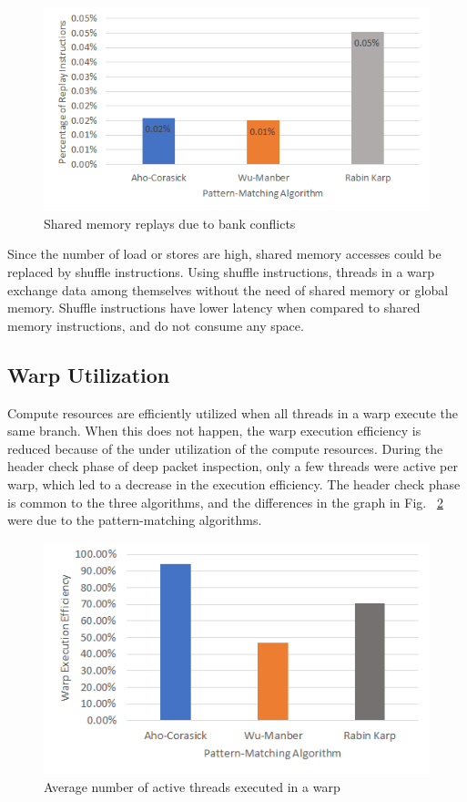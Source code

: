 \begin{figure}[H]
	\centering
	\includegraphics[width=12cm]{smreplay.png}
	\caption{Shared memory replays due to bank conflicts}
	\label{fig:smreplay}
\end{figure}
\squeezeup

Since the number of load or stores are high, shared memory accesses could be replaced by shuffle instructions. Using shuffle instructions, threads in a warp exchange data among themselves without the need of shared memory or global memory. Shuffle instructions have lower latency when compared to shared memory instructions, and do not consume any space.

\subsection{Warp Utilization}

Compute resources are efficiently utilized when all threads in a warp execute the same branch. When this does not happen, the warp execution efficiency is reduced because of the under utilization of the compute resources. During the header check phase of deep packet inspection, only a few threads were active per warp, which led to a decrease in the execution efficiency. The header check phase is common to the three algorithms, and the differences in the graph in Fig. ~\ref{fig:Warp Execution Efficiency} were due to the pattern-matching algorithms.

\begin{figure}[H]
	\centering
	\includegraphics[width=12cm]{warpexecefficiency.png}
	\caption{Average number of active threads executed in a warp}
	\label{fig:Warp Execution Efficiency}    
\end{figure}
\squeezeup


